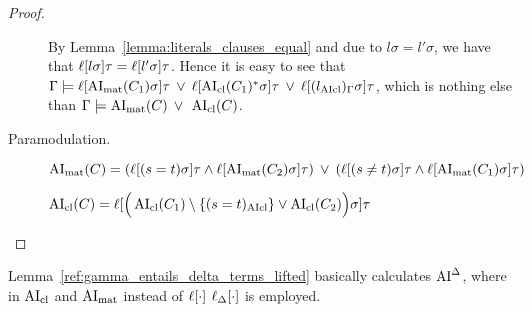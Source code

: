 \documentclass[,%
	paper=a4,%
	DIV14, %
	twoside=false,%
	liststotoc,
	bibtotoc,
	draft=false,%
	numbers=noendperiod
]{scrartcl}
\begin{document}
\begin{proof}
\begin{description}
			By Lemma~\ref{lemma:literals_clauses_equal} and due to $l\sigma = l'\sigma$, we have that $\ell[l\sigma]\tau = \ell[l'\sigma]\tau$.
			Hence it is easy to see that 
			$\Gamma \models \ell[\operatorname{AI}_\mathrm{mat}(C_1)\sigma]\tau \;\,{\lor}\;\, \ell[\operatorname{AI}_\mathrm{cl}(C_1)^*\sigma]\tau \;\,{\lor}\;\, \ell[(l_{\operatorname{AIcl}})_\Gamma\sigma]\tau $, which is nothing else than $\Gamma\entails\nolinebreak \AImatrix(C) \spam\lor \AIclause(C)$.

		\item[Paramodulation.]\hfill
			\begin{prooftree}
			\end{prooftree}

			$\operatorname{AI}_\mathrm{mat}(C) = (\ell[(s=t)\sigma]\tau \land \ell[\operatorname{AI}_\mathrm{mat}(C_2)\sigma]\tau ) \;\,{\lor}\;\, (\ell[(s\neq t)\sigma]\tau \land \ell[\operatorname{AI}_\mathrm{mat}(C_1)\sigma]\tau )$

			$\operatorname{AI}_\mathrm{cl}(C) = \ell[ \Big(\operatorname{AI}_\mathrm{cl}(C_1) \setminus \{(s=t)_{\operatorname{AIcl}}\} \lor \operatorname{AI}_\mathrm{cl}(C_2) \Big)\sigma]\tau $

			\mytodo{}

			\mytodo{}

			\mytodo{}

			\mytodo{}

			\mytodo{}

			\mytodo{}

			\mytodo{}

			\mytodo{}

			\mytodo{}




					\qedhere
	\end{description}
\end{proof}

\begin{conj}
	Lemma~\ref{ref:gamma_entails_delta_terms_lifted} basically calculates $\operatorname{AI}^\Delta$, where in $\operatorname{AI}_\mathrm{cl}$ and $\operatorname{AI}_\mathrm{mat}$ instead of $\ell[\cdot]$ $\ell_{\Delta}[\cdot]$ is employed.
\end{conj}
\end{document}
